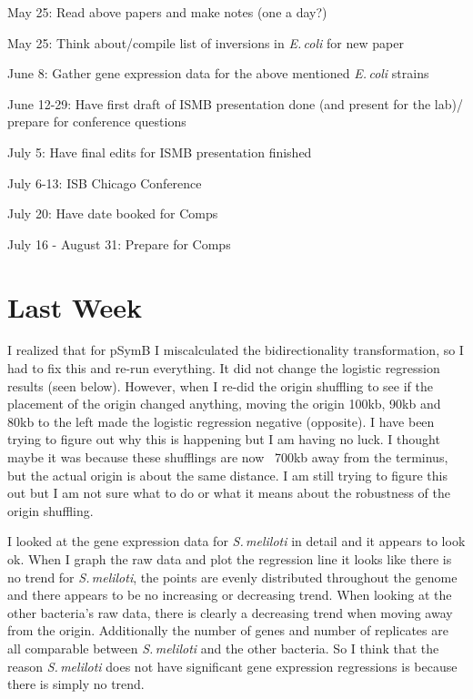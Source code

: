 \documentclass[12pt]{article}
\newcommand{\smel}{\textit{S.\,meliloti}\xspace}
\newcommand{\ecol}{\textit{E.\,coli}\xspace}
\newcommand{\pb}{pSymB\xspace}
\begin{document}
	May 25: Read above papers and make notes (one a day?)
	
	May 25: Think about/compile list of inversions in \ecol for new paper
	
	June 8: Gather gene expression data for the above mentioned \ecol strains
	
	June 12-29: Have first draft of ISMB presentation done (and present for the lab)/ prepare for conference questions
	
	July 5: Have final edits for ISMB presentation finished
	
	July 6-13: ISB Chicago Conference
	
	July 20: Have date booked for Comps
	
	July 16 - August 31: Prepare for Comps
	
%	
%	
%	
%	
%	
%	
%	
%	
	
\section*{Last Week}
I realized that for \pb I miscalculated the bidirectionality transformation, so I had to fix this and re-run everything.
It did not change the logistic regression results (seen below).
However, when I re-did the origin shuffling to see if the placement of the origin changed anything, moving the origin 100kb, 90kb and 80kb to the left made the logistic regression negative (opposite). I have been trying to figure out why this is happening but I am having no luck. I thought maybe it was because these shufflings are now ~700kb away from the terminus, but the actual origin is about the same distance. I am still trying to figure this out but I am not sure what to do or what it means about the robustness of the origin shuffling.

I looked at the gene expression data for \smel in detail and it appears to look ok.
When I graph the raw data and plot the regression line it looks like there is no trend for \smel, the points are evenly distributed throughout the genome and there appears to be no increasing or decreasing trend.
When looking at the other bacteria's raw data, there is clearly a decreasing trend when moving away from the origin.
Additionally the number of genes and number of replicates are all comparable between \smel and the other bacteria.
So I think that the reason \smel does not have significant gene expression regressions is because there is simply no trend.
\end{document}
